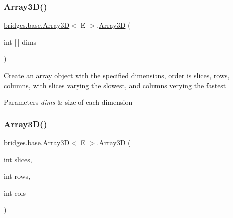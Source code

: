 \mbox{\label{classbridges_1_1base_1_1_array3_d_a015b271607e8b2b9e1425255f229af1b}} 
\subsubsection{\texorpdfstring{Array3\+D()}{Array3D()}\hspace{0.1cm}{\footnotesize\ttfamily [2/3]}}
{\footnotesize\ttfamily \hyperlink{classbridges_1_1base_1_1_array3_d}{bridges.\+base.\+Array3D}$<$ E $>$.\hyperlink{classbridges_1_1base_1_1_array3_d}{Array3D} (\begin{DoxyParamCaption}\item[{int \mbox{[}$\,$\mbox{]}}]{dims }\end{DoxyParamCaption})}

Create an array object with the specified dimensions, order is slices, rows, columns, with slices varying the slowest, and columns verying the fastest


\begin{DoxyParams}{Parameters}
{\em dims} & size of each dimension \\
\hline
\end{DoxyParams}
\mbox{\label{classbridges_1_1base_1_1_array3_d_a247f9b041470a190cdd63c2ff20c7aca}} 
\subsubsection{\texorpdfstring{Array3\+D()}{Array3D()}\hspace{0.1cm}{\footnotesize\ttfamily [3/3]}}
{\footnotesize\ttfamily \hyperlink{classbridges_1_1base_1_1_array3_d}{bridges.\+base.\+Array3D}$<$ E $>$.\hyperlink{classbridges_1_1base_1_1_array3_d}{Array3D} (\begin{DoxyParamCaption}\item[{int}]{slices,  }\item[{int}]{rows,  }\item[{int}]{cols }\end{DoxyParamCaption})}

